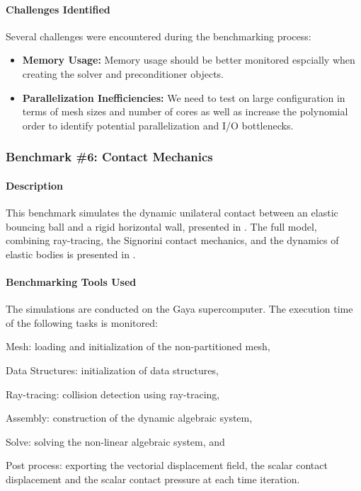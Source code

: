 \paragraph{Challenges Identified}
Several challenges were encountered during the benchmarking process: 
\begin{itemize}
    \item \textbf{Memory Usage:} Memory usage should be better monitored espcially when creating the solver and preconditioner objects.
    \item \textbf{Parallelization Inefficiencies:} We need to test on large configuration in terms of mesh sizes and number of cores as well as increase the polynomial order to identify potential parallelization and I/O bottlenecks.
\end{itemize}



\subsubsection{Benchmark \#6: Contact Mechanics}

\paragraph{Description}
This benchmark simulates the dynamic unilateral contact between an elastic bouncing
ball and a rigid horizontal wall, presented in \cite{chouly_explicit_2018}. The full model,
combining ray-tracing, the Signorini contact mechanics, and the dynamics of elastic bodies
is presented in \cite{van_landeghem_motion_nodate}. \\


\paragraph{Benchmarking Tools Used}

The simulations are conducted on the Gaya supercomputer. The execution time of the
following tasks is monitored:

\begin{inparaenum}[\it (i)]
    \item Mesh: loading and initialization of the non-partitioned mesh,
    \item Data Structures: initialization of data structures,
    \item Ray-tracing: collision detection using ray-tracing,
    \item Assembly: construction of the dynamic algebraic system,
    \item Solve: solving the non-linear algebraic system, and
    \item Post process: exporting the vectorial displacement field, the scalar contact displacement and the scalar contact pressure at each time iteration.
\end{inparaenum}

